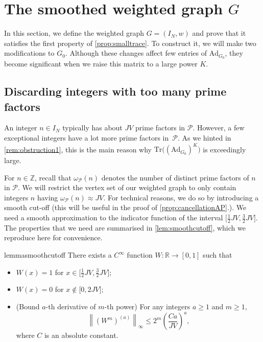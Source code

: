 \documentclass[11pt]{amsart}
\theoremstyle{definition}
\renewcommand{\leq}{\leqslant}
\renewcommand{\geq}{\geqslant}
\newcommand{\norm}[1]{\left\|#1\right\|}
\newcommand{\R}{\mathbb{R}}
\newcommand{\Z}{\mathbb{Z}}
\newcommand{\Ad}{\mathrm{Ad}}
\newcommand{\Tr}{\mathrm{Tr}}
\newcommand{\N}{I_N}
\newcommand{\primes}{\mathcal{P}}
\newcommand{\curlyL}{V}
\newcommand{\graph}{G}
\newcommand{\repR}{J}
\newcommand{\repK}{K}
\begin{document}

\section{The smoothed weighted graph $\graph$}
\label{sec:smooothed}
In this section, we define the weighted graph $\graph = (\N, w)$ and prove that it satisfies the first property of \cref{prop:smalltrace}. To construct it, we will make two modifications to $\graph_0$. Although these changes affect few entries of $\Ad_{\graph_0}$, they become significant when we raise this matrix to a large power $\repK$.

\subsection{Discarding integers with too many prime factors}
\label{sec:introW}

An integer $n\in \N$ typically has about $\repR \curlyL$ prime factors in $\primes$. However, a few exceptional integers have a lot more prime factors in~$\primes$. As we hinted in \cref{rem:obstruction1}, this is the main reason why $\Tr\big((\Ad_{\graph_0})^{\repK}\big)$ is exceedingly large. 

For $n\in \Z$, recall that $\omega_{\primes}(n)$ denotes the number of distinct prime factors of $n$ in $\primes$. We will restrict the vertex set of our weighted graph to only contain integers $n$ having $\omega_{\primes}(n) \approx \repR \curlyL$. For technical reasons, we do so by introducing a smooth cut-off (this will be useful in the proof of \cref{prop:cancellationAP}.). We need a smooth approximation to the indicator function of the interval $\big[\tfrac12 \repR \curlyL, \tfrac32 \repR \curlyL\big]$. The properties that we need are summarised in \cref{lem:smoothcutoff}, which we reproduce here for convenience.

\begin{restatable*}{lemma}{smoothcutoff}
\label{lem:smoothcutoff}
There exists a $C^{\infty}$ function $W : \R \to [0, 1]$ such that
\begin{itemize}
	\item $W(x) = 1$ for $x\in \big[\tfrac12 \repR \curlyL, \tfrac32 \repR \curlyL\big]$;
	\item $W(x) = 0$ for $x\not\in \big[0, 2\repR\curlyL\big]$;
	\item (Bound $a$-th derivative of $m$-th power) For any integers $a\geq 1$ and $m\geq 1$, 
	\begin{equation*}
		\norm{(W^m)^{(a)}}_{\infty} \leq 2^m \left(\frac{Ca}{\repR\curlyL}\right)^a,
	\end{equation*}
	where $C$ is an absolute constant.
\end{itemize}
\end{restatable*}
\end{document}
